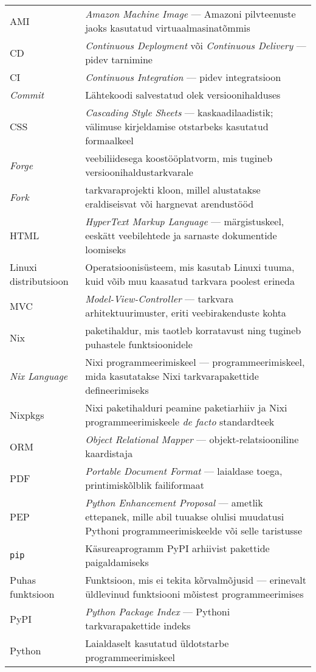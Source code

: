 \begin{longtable}{p{4cm}p{10cm}}
AMI&\textit{Amazon Machine Image} — Amazoni pilvteenuste jaoks kasutatud virtuaalmasinatõmmis\\
CD&\textit{Continuous Deployment} või \textit{Continuous Delivery} — pidev tarnimine\\
CI&\textit{Continuous Integration} — pidev integratsioon\\
\textit{Commit}&Lähtekoodi salvestatud olek versioonihalduses\\
CSS&\textit{Cascading Style Sheets} — kaskaadilaadistik; välimuse kirjeldamise otstarbeks kasutatud formaalkeel\\
\textit{Forge}&veebiliidesega koostööplatvorm, mis tugineb versioonihaldustarkvarale\\
\textit{Fork}&tarkvaraprojekti kloon, millel alustatakse eraldiseisvat või hargnevat arendustööd\\
HTML&\textit{HyperText Markup Language} — märgistuskeel, eeskätt veebilehtede ja sarnaste dokumentide loomiseks\\
Linuxi distributsioon&Operatsioonisüsteem, mis kasutab Linuxi tuuma, kuid võib muu kaasatud tarkvara poolest erineda\\
MVC&\textit{Model-View-Controller} — tarkvara arhitektuurimuster, eriti veebirakenduste kohta\\
Nix&paketihaldur, mis taotleb korratavust ning tugineb puhastele funktsioonidele\\
\textit{Nix Language}& Nixi programmeerimiskeel — programmeerimiskeel, mida kasutatakse Nixi tarkvarapakettide defineerimiseks\\
Nixpkgs&Nixi paketihalduri peamine paketiarhiiv ja Nixi programmeerimiskeele \textit{de facto} standardteek\\
ORM&\emph{Object Relational Mapper} — objekt-relatsiooniline kaardistaja\\
PDF&\emph{Portable Document Format} — laialdase toega, printimiskõlblik failiformaat\\
PEP&\textit{Python Enhancement Proposal} — ametlik ettepanek, mille abil tuuakse olulisi muudatusi Pythoni programmeerimiskeelde või selle taristusse\\
\texttt{pip}&Käsureaprogramm PyPI arhiivist pakettide paigaldamiseks\\
Puhas funktsioon&Funktsioon, mis ei tekita kõrvalmõjusid — erinevalt üldlevinud funktsiooni mõistest programmeerimises\\
PyPI&\textit{Python Package Index} — Pythoni tarkvarapakettide indeks\\
Python&Laialdaselt kasutatud üldotstarbe programmeerimiskeel\\
\end{longtable}
\addtocounter{table}{-1} 

